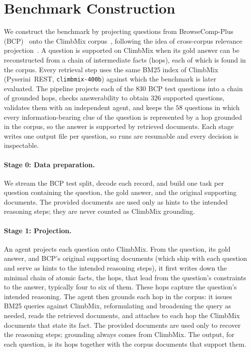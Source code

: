 
\section{Benchmark Construction}
\label{sec:methodology}

We construct the benchmark by projecting questions from BrowseComp-Plus
(BCP)~\cite{Chen_etal_arXiv2025_BCP} onto the ClimbMix corpus~\cite{DiaoShizhe_etal_NeurIPS2025},
following the idea of cross-corpus relevance projection~\cite{Asadi_etal_SIGIR2011poster}. A question is
supported on ClimbMix when its gold answer can be reconstructed from a chain of intermediate facts (hops),
each of which is found in the corpus. Every retrieval step uses the same BM25 index of ClimbMix
(Pyserini~REST, \texttt{climbmix-400b}) against which the benchmark is later evaluated. The pipeline projects
each of the $830$ BCP test questions into a chain of grounded hops, checks answerability to obtain $326$
supported questions, validates them with an independent agent, and keeps the $58$ questions in which every
information-bearing clue of the question is represented by a hop grounded in the corpus, so the answer is
supported by retrieved documents. Each stage writes one output file per question, so runs are resumable
and every decision is inspectable.

\paragraph{Stage 0: Data preparation.}
We stream the BCP test split, decode each record, and build one task per question containing the question,
the gold answer, and the original supporting documents. The provided documents are used only as hints to the
intended reasoning steps; they are never counted as ClimbMix grounding.

\paragraph{Stage 1: Projection.}
An agent projects each question onto ClimbMix. From the question, its gold answer, and BCP's original
supporting documents (which ship with each question and serve as hints to the intended reasoning steps), it
first writes down the minimal chain of atomic facts, the hops, that lead from the question's constraints to
the answer, typically four to six of them. These hops capture the question's intended reasoning. The agent
then grounds each hop in the corpus: it issues BM25 queries against ClimbMix, reformulating and broadening the
query as needed, reads the retrieved documents, and attaches to each hop the ClimbMix documents that state its
fact. The provided documents are used only to recover the reasoning steps; grounding always comes from
ClimbMix. The output, for each question, is its hops together with the corpus documents that support them.

